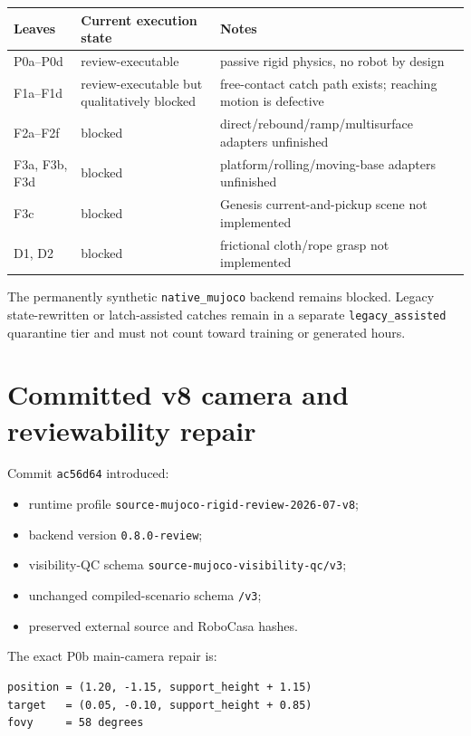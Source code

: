\documentclass[11pt]{article}
\begin{document}
\begin{longtable}{lll}
\toprule
Leaves & Current execution state & Notes \\
\midrule
\endhead
P0a--P0d & review-executable & passive rigid physics, no robot by design \\
F1a--F1d & review-executable but qualitatively blocked & free-contact catch path exists; reaching motion is defective \\
F2a--F2f & blocked & direct/rebound/ramp/multisurface adapters unfinished \\
F3a, F3b, F3d & blocked & platform/rolling/moving-base adapters unfinished \\
F3c & blocked & Genesis current-and-pickup scene not implemented \\
D1, D2 & blocked & frictional cloth/rope grasp not implemented \\
\bottomrule
\end{longtable}

The permanently synthetic \texttt{native\_mujoco} backend remains blocked.
Legacy state-rewritten or latch-assisted catches remain in a separate
\texttt{legacy\_assisted} quarantine tier and must not count toward training
or generated hours.

\section{Committed v8 camera and reviewability repair}

Commit \texttt{ac56d64} introduced:

\begin{itemize}
  \item runtime profile \texttt{source-mujoco-rigid-review-2026-07-v8};
  \item backend version \texttt{0.8.0-review};
  \item visibility-QC schema \texttt{source-mujoco-visibility-qc/v3};
  \item unchanged compiled-scenario schema \texttt{/v3};
  \item preserved external source and RoboCasa hashes.
\end{itemize}

The exact P0b main-camera repair is:

\begin{verbatim}
position = (1.20, -1.15, support_height + 1.15)
target   = (0.05, -0.10, support_height + 0.85)
fovy     = 58 degrees
\end{verbatim}
\end{document}
